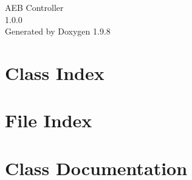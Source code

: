 \documentclass[twoside]{book}
\newcommand{\+}{\discretionary{\mbox{\scriptsize$\hookleftarrow$}}{}{}}
\newcommand{\clearemptydoublepage}{%
    \newpage{\pagestyle{empty}\cleardoublepage}%
  }
\begin{document}
  \raggedbottom
    \hypersetup{pageanchor=false,
                bookmarksnumbered=true,
                pdfencoding=unicode
               }
  \begin{titlepage}
  \vspace*{7cm}
  \begin{center}%
  {\Large AEB Controller}\\
  [1ex]\large 1.\+0.\+0 \\
  \vspace*{1cm}
  {\large Generated by Doxygen 1.9.8}\\
  \end{center}
  \end{titlepage}
  \clearemptydoublepage
  \tableofcontents
  \clearemptydoublepage
  \hypersetup{pageanchor=true}



\chapter{Class Index}

\chapter{File Index}

\chapter{Class Documentation}




\end{document}
